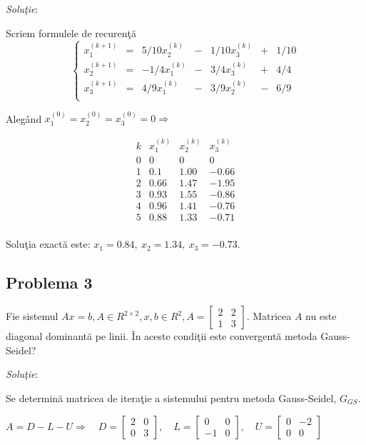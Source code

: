\documentclass{exam}
\theoremstyle{definition}
\begin{document}
\textit{Solu\c{t}ie}:

Scriem formulele de recuren\c{t}\u{a}
$$\left\{
	\begin{array}{ccccccc}
		x_1^{(k+1)} & = & 5/10x_2^{(k)} & - & 1/10x_3^{(k)} & + & 1/10 \\
		x_2^{(k+1)} & = & -1/4x_1^{(k)} & - & 3/4x_3^{(k)}  & + & 4/4  \\
		x_3^{(k+1)} & = & 4/9x_1^{(k)}  & - & 3/9x_2^{(k)}  & - & 6/9  \\
	\end{array} \right.
$$

Aleg\^{a}nd $x_{1}^{(0)}=x_{2}^{(0)}=x_3^{(0)}=0\Rightarrow$


$$  \begin{array}{c||ccc}
		k & x_1^{(k)} & x_2^{(k)} & x_3^{(k)} \\
		\hline
		0 & 0         & 0         & 0         \\
		1 & 0.1       & 1.00      & -0.66     \\
		2 & 0.66      & 1.47      & -1.95     \\
		3 & 0.93      & 1.55      & -0.86     \\
		4 & 0.96      & 1.41      & -0.76     \\
		5 & 0.88      & 1.33      & -0.71     \\
	\end{array}
$$

Solu\c{t}ia exact\u{a} este: $x_{1}=0.84,\ x_{2}=1.34,\ x_{3}=-0.73$.

\subsection{Problema 3}
Fie sistemul $Ax=b, A \in R^{2\times 2}, x, b \in R^{2},
	A =
	\left[ {\begin{array}{cc}
					2 & 2 \\
					1 & 3
				\end{array} } \right]
$. Matricea $A$ nu este diagonal dominant\u{a} pe linii. \^{I}n aceste condi\c{t}ii este convergent\u{a} metoda Gauss-Seidel?

\textit{Solu\c{t}ie}:

Se determin\u{a} matricea de itera\c{t}ie a sistemului pentru metoda Gauss-Seidel, ${G}_{GS}$.

$A = D - L - U \Rightarrow \quad D = \left[ {\begin{array}{cc}
					2 & 0 \\
					0 & 3
				\end{array} } \right], \quad L =
	\left[ {\begin{array}{cc}
					0  & 0 \\
					-1 & 0
				\end{array} } \right], \quad U =
	\left[ {\begin{array}{cc}
					0 & -2 \\
					0 & 0
				\end{array} } \right]$
\end{document}
